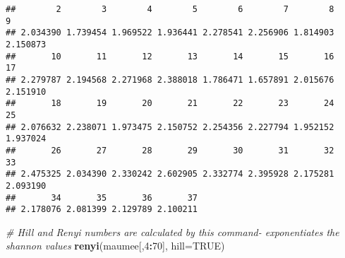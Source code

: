 \documentclass[]{article}
\newenvironment{Shaded}{\begin{snugshade}}{\end{snugshade}}
\newcommand{\KeywordTok}[1]{\textcolor[rgb]{0.13,0.29,0.53}{\textbf{#1}}}
\newcommand{\DataTypeTok}[1]{\textcolor[rgb]{0.13,0.29,0.53}{#1}}
\newcommand{\DecValTok}[1]{\textcolor[rgb]{0.00,0.00,0.81}{#1}}
\newcommand{\CommentTok}[1]{\textcolor[rgb]{0.56,0.35,0.01}{\textit{#1}}}
\newcommand{\OtherTok}[1]{\textcolor[rgb]{0.56,0.35,0.01}{#1}}
\newcommand{\OperatorTok}[1]{\textcolor[rgb]{0.81,0.36,0.00}{\textbf{#1}}}
\newcommand{\NormalTok}[1]{#1}
\begin{document}
\begin{verbatim}
##        2        3        4        5        6        7        8        9 
## 2.034390 1.739454 1.969522 1.936441 2.278541 2.256906 1.814903 2.150873 
##       10       11       12       13       14       15       16       17 
## 2.279787 2.194568 2.271968 2.388018 1.786471 1.657891 2.015676 2.151910 
##       18       19       20       21       22       23       24       25 
## 2.076632 2.238071 1.973475 2.150752 2.254356 2.227794 1.952152 1.937024 
##       26       27       28       29       30       31       32       33 
## 2.475325 2.034390 2.330242 2.602905 2.332774 2.395928 2.175281 2.093190 
##       34       35       36       37 
## 2.178076 2.081399 2.129789 2.100211
\end{verbatim}

\begin{Shaded}
\begin{Highlighting}[]
\CommentTok{# Hill and Renyi numbers are calculated by this command- exponentiates the shannon values}
\KeywordTok{renyi}\NormalTok{(maumee[,}\DecValTok{4}\OperatorTok{:}\DecValTok{70}\NormalTok{], }\DataTypeTok{hill=}\OtherTok{TRUE}\NormalTok{)}
\end{Highlighting}
\end{Shaded}
\end{document}
